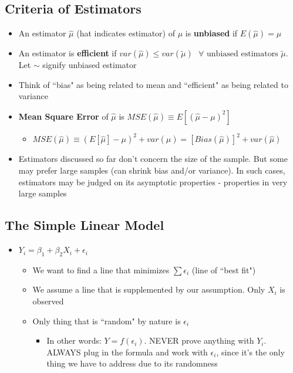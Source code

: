 \documentclass[10pt, oneside]{article}
\begin{document}
\subsection{Criteria of Estimators}
\begin{itemize}
    \item An estimator $\hat \mu$ (hat indicates estimator) of $\mu$ is \textbf{unbiased} if $E(\hat \mu) = \mu$
    \item An estimator is \textbf{efficient} if $var(\hat \mu) \leq var(\tilde{\mu})\text{ } \forall \text{ unbiased estimators } \tilde \mu$. Let $\sim$ signify unbiased estimator
    \item Think of ``bias" as being related to mean and ``efficient" as being related to variance
    \item \textbf{Mean Square Error} of $\hat \mu$ is $MSE(\hat \mu)\equiv E[(\hat \mu -\mu)^2]$
    \begin{itemize}
        \item $MSE(\hat \mu) \equiv (E[\hat \mu] -\mu)^2 + var(\hat \mu) = [Bias(\hat \mu)]^2 + var(\hat \mu)$
    \end{itemize}
    \item Estimators discussed so far don't concern the size of the sample. But some may prefer large samples (can shrink bias and/or variance). In such cases, estimators may be judged on its asymptotic properties - properties in very large samples
\end{itemize}

\subsection{The Simple Linear Model}
\begin{itemize}
    \item $Y_i =\beta_1 + \beta_2 X_i + \epsilon_i$
    \begin{itemize}
        \item We want to find a line that minimizes $\sum \epsilon_i$ (line of ``best fit")
        \item We assume a line that is supplemented by our assumption. Only $X_i$ is observed
        \item Only thing that is ``random" by nature is $\epsilon_i$
        \begin{itemize}
            \item In other words: $Y=f(\epsilon_i)$. NEVER prove anything with $Y_i$. ALWAYS plug in the formula and work with $\epsilon_i$, since it's the only thing we have to address due to its randomness
        \end{itemize}
    \end{itemize}
\end{itemize}
\end{document}

